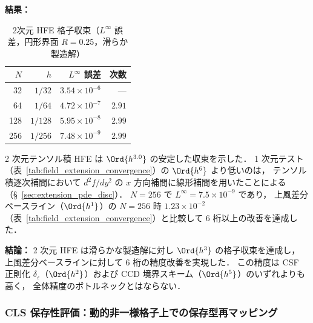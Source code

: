 \noindent\textbf{結果：}

\begin{table}[htbp]
\centering
\caption{2次元 HFE 格子収束（$L^\infty$ 誤差，円形界面 $R=0.25$，滑らか製造解）}
\label{tab:hfe_2d_convergence}
\renewcommand{\arraystretch}{1.3}
\begin{tabular}{rrrr}
\toprule
$N$ & $h$ & $L^\infty$ 誤差 & 次数 \\
\midrule
 32 & $1/32$  & $3.54 \times 10^{-6}$ & ---  \\
 64 & $1/64$  & $4.72 \times 10^{-7}$ & $2.91$ \\
128 & $1/128$ & $5.95 \times 10^{-8}$ & $2.99$ \\
256 & $1/256$ & $7.48 \times 10^{-9}$ & $2.99$ \\
\bottomrule
\end{tabular}
\end{table}

2 次元テンソル積 HFE は $\Ord{h^{3.0}}$ の安定した収束を示した．
1 次元テスト（表~\ref{tab:field_extension_convergence}）の $\Ord{h^6}$ より低いのは，
テンソル積逐次補間において $d^2 f/dy^2$ の $x$ 方向補間に線形補間を用いたことによる（§~\ref{sec:extension_pde_disc}）．
$N = 256$ で $L^\infty = 7.5 \times 10^{-9}$ であり，
上風差分ベースライン（$\Ord{h^1}$）の $N = 256$ 時 $1.23 \times 10^{-2}$（表~\ref{tab:field_extension_convergence}）と比較して
6 桁以上の改善を達成した．

\noindent\textbf{結論：}
2 次元 HFE は滑らかな製造解に対し $\Ord{h^3}$ の格子収束を達成し，
上風差分ベースラインに対して 6 桁の精度改善を実現した．
この精度は CSF 正則化 $\delta_\varepsilon$（$\Ord{h^2}$）および
CCD 境界スキーム（$\Ord{h^5}$）のいずれよりも高く，
全体精度のボトルネックとはならない．

\subsubsection{CLS 保存性評価：動的非一様格子上での保存型再マッピング}
\label{sec:cls_conservation}%
\label{app:cls_conservation}%

